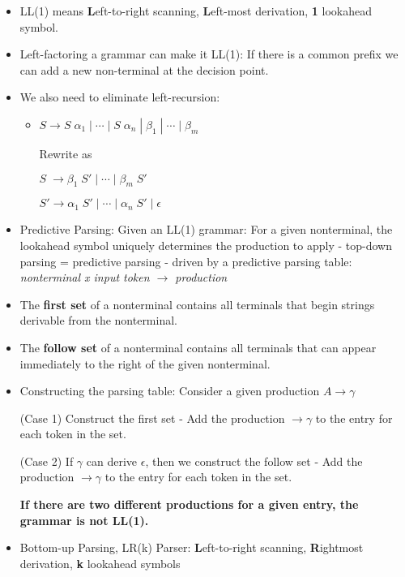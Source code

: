 \begin{itemize}
\begin{itemize}
		\item LL(1) means \textbf{L}eft-to-right scanning, \textbf{L}eft-most derivation, \textbf{1} lookahead symbol.
		
		\item Left-factoring a grammar can make it LL(1): If there is a common prefix we can add a new non-terminal at the decision point.
		
		\item We also need to eliminate left-recursion: 
		\begin{itemize}
			\item $S \rightarrow S\; \alpha_1 \;|\; \cdots \;|\; S\; \alpha _n \;|\; \beta _1 \;|\; \cdots \;|\; \beta_m$
			
			Rewrite as
			
			$S\; \rightarrow \beta _1\; S' \;|\; \cdots \;|\; \beta _m\; S'$
			
			$S' \rightarrow \alpha_1\; S' \;|\;  \cdots \;|\; \alpha_n\; S' \;|\; \epsilon$ 
		\end{itemize}
	
		\item Predictive Parsing: Given an LL(1) grammar: For a given nonterminal, the lookahead symbol uniquely determines the production to apply - top-down parsing = predictive parsing - driven by a predictive parsing table: \textit{nonterminal x input token $\rightarrow$ production}
		
		\item The \textbf{first set} of a nonterminal contains all terminals that begin strings derivable from the nonterminal.
		
		\item The \textbf{follow set} of a nonterminal contains all terminals that can appear immediately to the right of the given nonterminal.
		
		\item Constructing the parsing table: 
		Consider a given production $A \rightarrow \gamma$
		
		(Case 1) Construct the first set - Add the production $\rightarrow \gamma$ to the entry for each token in the set.
		
		(Case 2) If $\gamma$ can derive $\epsilon$, then we construct the follow set - Add the production $\rightarrow \gamma$ to the entry for each token in the set.
		
		\textbf{If there are two different productions for a given entry, the grammar is not LL(1).}
		
		\item Bottom-up Parsing, LR(k) Parser: \textbf{L}eft-to-right scanning, \textbf{R}ightmost derivation, \textbf{k} lookahead symbols
		

\end{itemize}
\end{itemize}

